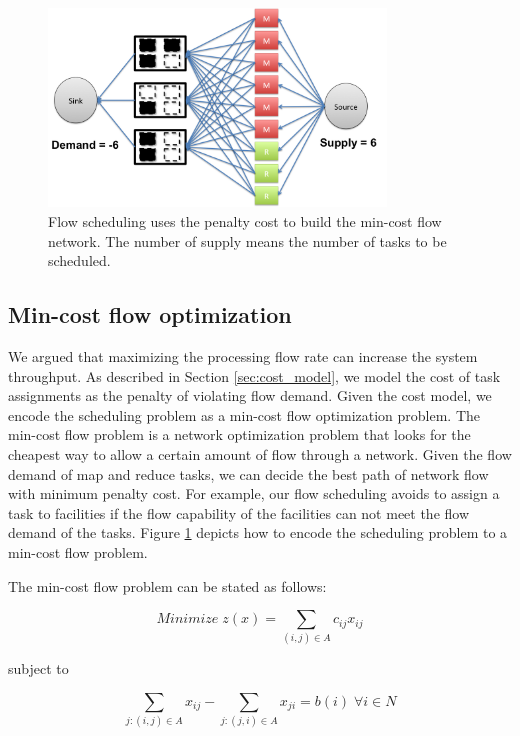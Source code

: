 \begin{figure}[ht]
    \centering
    \includegraphics[width=0.8\textwidth]{figures/min_cost_model.png}
    \caption{Flow scheduling uses the penalty cost to build the min-cost flow network. The number of supply means the number of tasks to be scheduled.}
    \label{fig:min_cost_model}
\end{figure}


\subsection{Min-cost flow optimization}
\label{sec:min_cost_flow}

We argued that maximizing the processing flow rate can increase the system throughput.
As described in Section \ref{sec:cost_model}, we model the cost of task assignments as the penalty of violating flow demand.
Given the cost model, we encode the scheduling problem as a min-cost flow optimization problem.
The min-cost flow problem is a network optimization problem that looks for the cheapest way to allow a certain amount of flow through a network.
Given the flow demand of map and reduce tasks, we can decide the best path of network flow with minimum penalty cost.
For example, our flow scheduling avoids to assign a task to facilities if the flow capability of the facilities can not meet the flow demand of the tasks.
Figure \ref{fig:min_cost_model} depicts how to encode the scheduling problem to a min-cost flow problem.

The min-cost flow problem can be stated as follows:

\begin{equation*}
Minimize \; z(x)=\sum\limits_{(i,j) \in A} c_{ij}x_{ij}
\end{equation*}

subject to

\begin{equation*}
\sum\limits_{j:(i,j) \in A} x_{ij} - \sum\limits_{j:(j,i) \in A} x_{ji} = b(i) \; \forall i \in N
\end{equation*}

